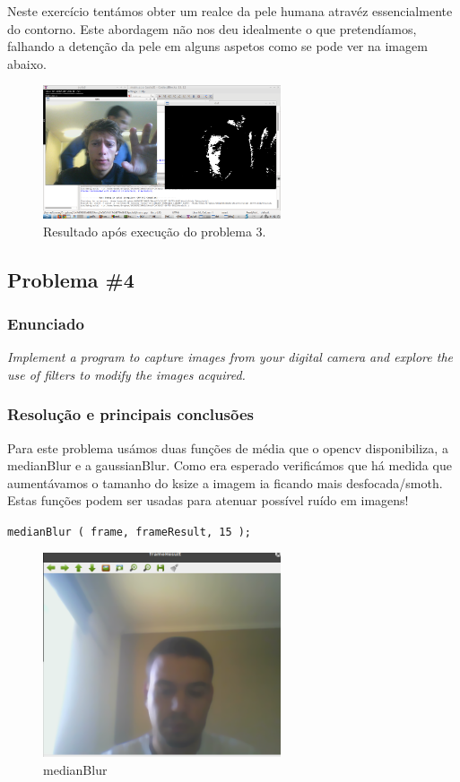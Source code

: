 \documentclass[portuguese, times, mirror]{revdetua}
\begin{document}
Neste exercício tentámos obter um realce da pele humana atravéz essencialmente do contorno. Este abordagem não nos deu idealmente o que pretendíamos, falhando a detenção da pele em alguns aspetos como se pode ver na imagem abaixo.


\begin{figure}[ht!]
\centering
\includegraphics[width=70mm]{img/ex3.png}
\caption{Resultado após execução do problema 3.}
\end{figure}

\subsection{Problema \#4}

\subsubsection{Enunciado}
\textit{ Implement a program to capture images from your digital camera and explore the use of filters
to modify the images acquired.}

\subsubsection{Resolução e principais conclusões}

Para este problema usámos duas funções de média que o opencv disponibiliza, a medianBlur e a gaussianBlur. Como era esperado verificámos que há medida que aumentávamos o tamanho do ksize a imagem ia ficando mais desfocada/smoth. Estas funções podem ser usadas para atenuar possível ruído em imagens!
    

\texttt{medianBlur ( frame, frameResult, 15 );}

\begin{figure}[ht!]
\centering
\includegraphics[width=70mm]{img/4_1.png}
\caption{medianBlur}
\end{figure}
\end{document}
